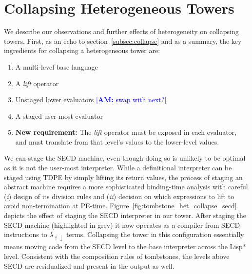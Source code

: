 \documentclass[sigplan,anonymous,review]{acmart}
\newcommand{\AMcomment}[1]{\textcolor{blue}{[\textbf{AM:} #1]}}
\newcommand{\mslang}{$\lambda_{\uparrow\downarrow}$}
\theoremstyle{definition}
\begin{document}
\section{Collapsing Heterogeneous Towers}\label{subsec:collapseh}
We describe our observations and further effects of heterogeneity on collapsing towers.
First, as an echo to section~\ref{subsec:collapse} and as a summary, the key ingredients for collapsing a heterogeneous tower are:
\begin{enumerate}
    \item A multi-level base language
    \item A \textit{lift} operator
    \item Unstaged lower evaluators \AMcomment{swap with next?}
    \item A staged user-most evaluator
    \item \textbf{New requirement: } The \textit{lift} operator must be exposed in each evaluator, and must translate from that level's values to the lower-level values.
\end{enumerate}

We can stage the SECD machine, even though doing so is unlikely to be
optimal as it is not the user-most interpreter.
While a definitional interpreter can be staged using TDPE by simply lifting
its return values, the process of staging an abstract machine requires a more sophisticated binding-time analysis with careful ({\it i\/}) design of its division rules
and ({\it ii\/}) decision on which expressions 
to lift to avoid non-termination at PE-time.
Figure~\ref{fig:tombstone_het_collapse_secd} depicts the effect of staging the SECD interpreter in our tower. After staging the SECD machine (highlighted in grey) it now operates as a compiler from SECD instructions to \mslang{} terms. Collapsing the tower in this configuration essentially means moving code from the SECD level to the base interpreter across the Lisp* level. Consistent with the composition rules of tombstones, the levels above SECD are residualized and present in the output as well.
\end{document}
